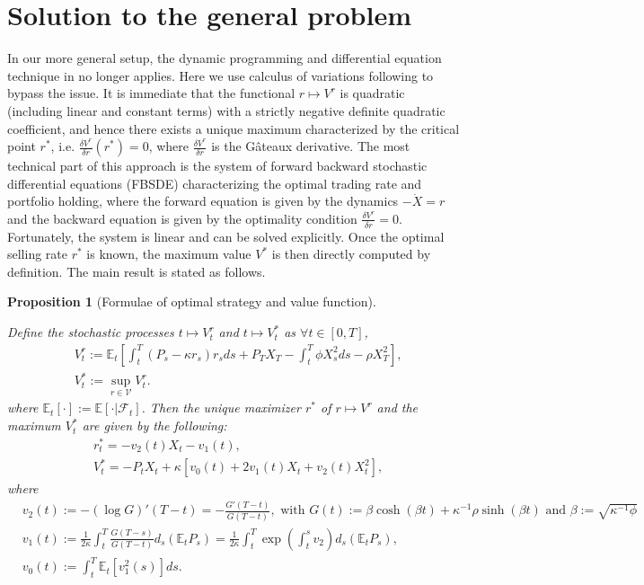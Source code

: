 \documentclass[openany,oneside]{article}
\newtheorem{prop}[thm]{Proposition}
\theoremstyle{definition}
\theoremstyle{remark}
\newcommand{\E}{\mathbb{E}} %
\newcommand{\F}{\mathcal{F}} %
\begin{document}
\section{Solution to the general problem}
In our more general setup, the dynamic programming and differential equation technique in \cite{lehalle2017incorporating} no longer applies. Here we use calculus of variations following \cite{bouchard2017equilibrium} to bypass the issue. It is immediate that the functional $r\mapsto V^r$ is quadratic (including linear and constant terms) with a strictly negative definite quadratic coefficient, and hence there exists a unique maximum characterized by the critical point $r^\ast$, i.e. $\frac{\delta V^r}{\delta r}(r^\ast) =0$, where $\frac{\delta V^r}{\delta r}$ is the G\^ateaux derivative. The most technical part of this approach is the system of forward backward stochastic differential equations (FBSDE) characterizing the optimal trading rate and portfolio holding, where the forward equation is given by the dynamics $-\dot{X}=r$ and the backward equation is given by the optimality condition $\frac{\delta V^r}{\delta r}=0$. Fortunately, the system is linear and can be solved explicitly. Once the optimal selling rate $r^\ast$ is known, the maximum value $V^\ast$ is then directly computed by definition. The main result is stated as follows.

\begin{prop}[Formulae of optimal strategy and value function]\label{main}

Define the stochastic processes $t\mapsto V^r_t$ and $t\mapsto V^\ast_t$ as $\forall t\in[0,T]$,
\begin{align*}
& V^r_t := \E_t \left[\int_t^T (P_s-\kappa r_s)r_s ds + P_T X_T -\int_t^T \phi X_s^2 ds - \rho X_T^2 \right],\\
& V^\ast_t := \sup_{r\in\mathcal{V}} V^r_t.
\end{align*}
where $\E_t[\cdot]:=\E[\cdot \vert \F_t]$. Then the unique maximizer $r^\ast$ of $r\mapsto V^r$ and the maximum $V^\ast_t$ are given by the following:
\begin{align*}
& r^\ast_t = -v_2(t) X_t - v_1(t), \\
& V^\ast_t = -P_t X_t + \kappa\left[v_0(t) + 2 v_1(t) X_t + v_2(t) X_t^2\right],
\end{align*}
where
\begin{align*}
& v_2(t):= -(\log G)'(T-t) = -\frac{G'(T-t)}{G(T-t)}, \textrm{ with } G(t):=\beta\cosh(\beta t)+\kappa^{-1}\rho\sinh(\beta t) \textrm{ and } \beta:=\sqrt{\kappa^{-1}\phi}\\
& v_1(t):= \frac{1}{2\kappa}\int_t^T \frac{G(T-s)}{G(T-t)} d_s(\E_t P_s) = \frac{1}{2\kappa}\int_t^T \exp\left(\int_t^s v_2\right) d_s(\E_t P_s), \\
& v_0(t):= \int_t^T \E_t[v_1^2(s)] ds.
\end{align*}
\end{prop}
\end{document}
